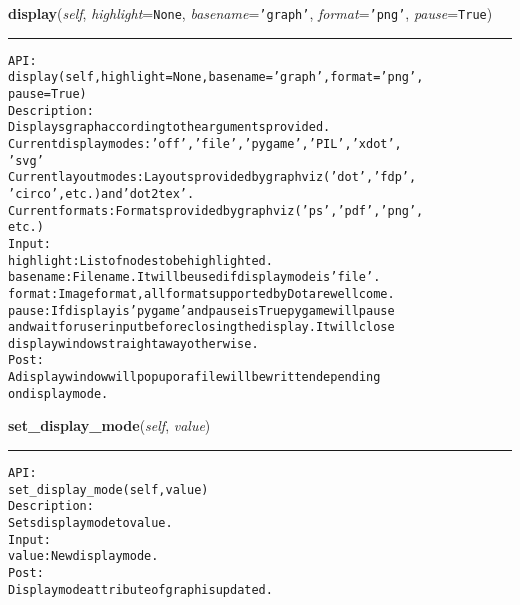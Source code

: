\hspace{.8\funcindent}\begin{boxedminipage}{\funcwidth}

    \raggedright \textbf{display}(\textit{self}, \textit{highlight}={\tt None}, \textit{basename}={\tt \texttt{'}\texttt{graph}\texttt{'}}, \textit{format}={\tt \texttt{'}\texttt{png}\texttt{'}}, \textit{pause}={\tt True})

    \vspace{-1.5ex}

    \rule{\textwidth}{0.5\fboxrule}
\setlength{\parskip}{2ex}
\begin{alltt}

API:
    display(self, highlight = None, basename = 'graph', format = 'png',
        pause = True)
Description:
    Displays graph according to the arguments provided.
    Current display modes: 'off', 'file', 'pygame', 'PIL', 'xdot',
    'svg'
    Current layout modes: Layouts provided by graphviz ('dot', 'fdp',
    'circo', etc.) and 'dot2tex'.
    Current formats: Formats provided by graphviz ('ps', 'pdf', 'png',
    etc.)
Input:
    highlight: List of nodes to be highlighted.
    basename: File name. It will be used if display mode is 'file'.
    format: Image format, all format supported by Dot are wellcome.
    pause: If display is 'pygame' and pause is True pygame will pause
    and wait for user input before closing the display. It will close
    display window straightaway otherwise.
Post:
    A display window will pop up or a file will be written depending
    on display mode.
\end{alltt}

\setlength{\parskip}{1ex}
    \end{boxedminipage}

    \label{coinor:gimpy:graph:Graph:set_display_mode}

    \vspace{0.5ex}

\hspace{.8\funcindent}\begin{boxedminipage}{\funcwidth}

    \raggedright \textbf{set\_display\_mode}(\textit{self}, \textit{value})

    \vspace{-1.5ex}

    \rule{\textwidth}{0.5\fboxrule}
\setlength{\parskip}{2ex}
\begin{alltt}

API:
    set\_display\_mode(self, value)
Description:
    Sets display mode to value.
Input:
    value: New display mode.
Post:
    Display mode attribute of graph is updated.
\end{alltt}

\setlength{\parskip}{1ex}
    \end{boxedminipage}

